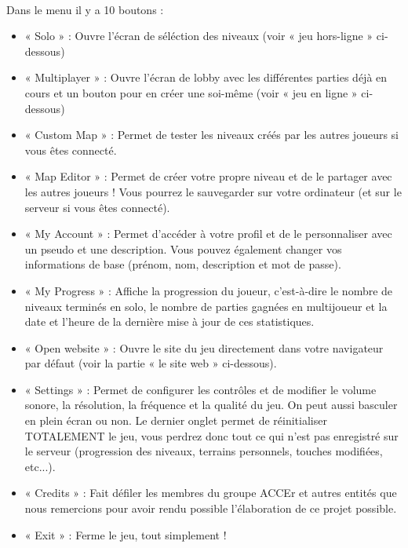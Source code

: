 \documentclass[titlepage, 11px, a4paper]{report}
\begin{document}
\paragraph*{} \hspace{0pt}
Dans le menu il y a 10 boutons : \\
{\begin{itemize}
	\item « Solo » : Ouvre l'écran de séléction des niveaux (voir « jeu hors-ligne » ci-dessous)
	\item « Multiplayer » : Ouvre l'écran de lobby avec les différentes parties déjà en cours et 
		un bouton pour en créer une soi-même (voir « jeu en ligne » ci-dessous)
	\item « Custom Map » : Permet de tester les niveaux créés par les autres joueurs si vous êtes connecté.
	\item « Map Editor » : Permet de créer votre propre niveau et de le partager avec les autres joueurs ! 
		Vous pourrez le sauvegarder sur votre ordinateur (et sur le serveur si vous êtes connecté).
	\item « My Account » :  Permet d'accéder à votre profil et de le personnaliser avec un pseudo et une description. 
		Vous pouvez également changer vos informations de base (prénom, nom, description et mot de passe).
	\item « My Progress » : Affiche la progression du joueur, c'est-à-dire le nombre de niveaux terminés 
		en solo, le nombre de parties gagnées en multijoueur et la date et l'heure de la dernière mise à jour 
		de ces statistiques.
	\item « Open website » : Ouvre le site du jeu directement dans votre navigateur par défaut (voir la partie 
		« le site web » ci-dessous).
	\item « Settings » : Permet de configurer les contrôles et de modifier le volume sonore, la résolution, la fréquence 
		et la qualité du jeu. On peut aussi basculer en plein écran ou non. Le dernier onglet permet de réinitialiser 
		TOTALEMENT le jeu, vous perdrez donc tout ce qui n'est pas enregistré sur le serveur (progression des niveaux, 
		terrains personnels, touches modifiées, etc...).
	\item « Credits » : Fait défiler les membres du groupe ACCEr et autres entités que nous remercions pour avoir 
		rendu possible l'élaboration de ce projet possible.
	\item « Exit » :  Ferme le jeu, tout simplement !  \\
\end{itemize}}
\end{document}
